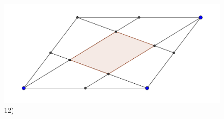\begin{figure}[!h]
\endminipage\hfill
{}
\includegraphics[width=1.2\linewidth]{4}
\caption{12)}
\endminipage\hfill
{}
\endminipage
\end{figure}
